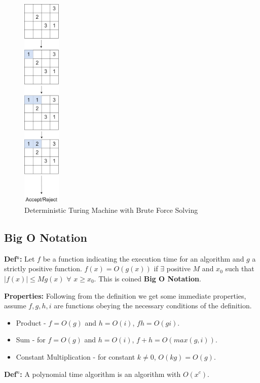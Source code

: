 \documentclass[a4paper,11pt]{report}
\begin{document}
\begin{figure}[h!]
	\begin{center}
		\includegraphics[width=18mm]{figures/turing_determinism.png}
	\end{center}
	\caption{\label{dtm} Deterministic Turing Machine with Brute Force Solving}
\end{figure}

\subsection{Big O Notation}

\textbf{Def$^\text{n}$:} Let $f$ be a function indicating the execution time for an algorithm and $g$ a strictly positive function. $f(x)=O (g(x))$ if $\exists$ positive $ M$ and $x_0$ such that $|f(x)|\leq Mg(x)$ $\forall$ $x\geq x_0$. This is coined \textbf{Big O Notation}.

\textbf{Properties:} Following from the definition we get some immediate properties, assume $f,g,h,i$ are functions obeying the necessary conditions of the definition.
\begin{itemize}
\item Product - $f=O(g)$ and $h=O(i)$, $fh=O(gi)$.
\item Sum - for $f=O(g)$ and $h=O(i)$, $f+h = O(max(g,i))$.
\item Constant Multiplication - for constant $k\neq0$, $O(kg)=O(g)$.
\end{itemize}

\textbf{Def$^n$:} A polynomial time algorithm is an algorithm with $O(x^c)$.
\end{document}
